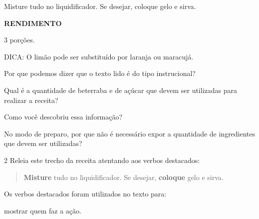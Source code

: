 \begin{escolha}
Misture tudo no liquidificador. Se desejar, coloque gelo e sirva.

\textbf{RENDIMENTO}

3 porções.

DICA: O limão pode ser substituído por laranja ou maracujá.


\item Por que podemos dizer que o texto lido é do tipo instrucional?


\item Qual é a quantidade de beterraba e de açúcar que devem ser utilizadas
para realizar a receita?


\item Como você descobriu essa informação?


\item No modo de preparo, por que não é necessário expor a quantidade de
ingredientes que devem ser utilizadas?


\num{2} Releia este trecho da receita atentando aos verbos destacados:

\begin{quote}
\textbf{Misture} tudo no liquidificador. Se desejar, \textbf{coloque} gelo e sirva.
\end{quote}

\begin{escolha}
\item
  Os verbos destacados foram utilizados no texto para:

\begin{boxlist}
\boxitem[] mostrar quem faz a ação.


\end{boxlist}
\end{escolha}
\end{escolha}
